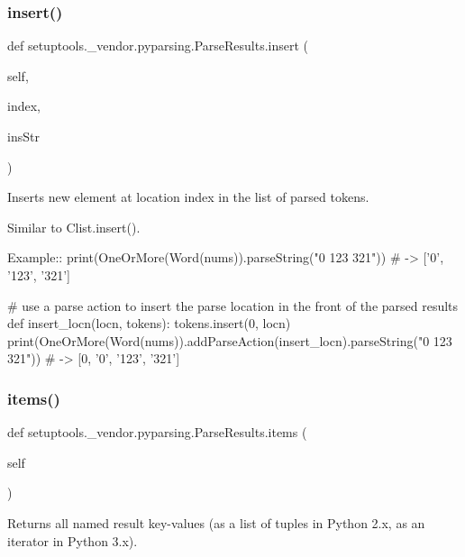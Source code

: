 \subsubsection{\texorpdfstring{insert()}{insert()}}
{\footnotesize\ttfamily def setuptools.\+\_\+vendor.\+pyparsing.\+Parse\+Results.\+insert (\begin{DoxyParamCaption}\item[{}]{self,  }\item[{}]{index,  }\item[{}]{ins\+Str }\end{DoxyParamCaption})}

\begin{DoxyVerb}Inserts new element at location index in the list of parsed tokens.

Similar to C{list.insert()}.

Example::
    print(OneOrMore(Word(nums)).parseString("0 123 321")) # -> ['0', '123', '321']

    # use a parse action to insert the parse location in the front of the parsed results
    def insert_locn(locn, tokens):
tokens.insert(0, locn)
    print(OneOrMore(Word(nums)).addParseAction(insert_locn).parseString("0 123 321")) # -> [0, '0', '123', '321']
\end{DoxyVerb}
 \mbox{\label{classsetuptools_1_1__vendor_1_1pyparsing_1_1ParseResults_a6b2179c3bd82a9570a615a71d2f90fdb}} 
\subsubsection{\texorpdfstring{items()}{items()}}
{\footnotesize\ttfamily def setuptools.\+\_\+vendor.\+pyparsing.\+Parse\+Results.\+items (\begin{DoxyParamCaption}\item[{}]{self }\end{DoxyParamCaption})}

\begin{DoxyVerb}Returns all named result key-values (as a list of tuples in Python 2.x, as an iterator in Python 3.x).\end{DoxyVerb}
 \mbox{\label{classsetuptools_1_1__vendor_1_1pyparsing_1_1ParseResults_afe6765f5f4372b21e973fb235bdd179c}} 
